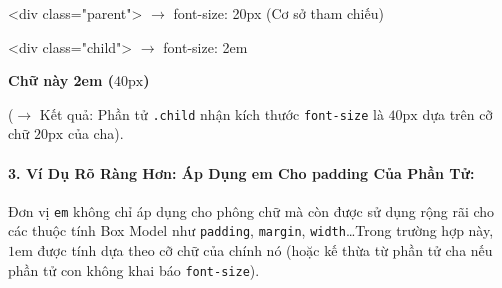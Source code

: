 \documentclass[11pt,oneside]{book}
\newcommand{\codeinline}[1]{\textcolor{accentOrange}{\texttt{#1}}}
\begin{document}
\begin{browserWindow}
\sffamily\small
\begin{tcolorbox}[enhanced, colback=white, colframe=primaryBlue!25, arc=6pt, boxrule=0.8pt, top=8pt, bottom=8pt, left=10pt, right=10pt]
  \begin{tcolorbox}[enhanced, colback=slateBg, colframe=gray!30, arc=4pt, boxrule=0.8pt, top=6pt, bottom=6pt, left=8pt, right=8pt]
    \textcolor{gray!80!black}{\scriptsize\ttfamily <div class="parent"> $\rightarrow$ font-size: 20px (Cơ sở tham chiếu)}
    \par\vspace{4pt}
    \begin{tcolorbox}[enhanced, colback=white, colframe=primaryBlue!40, arc=4pt, boxrule=1pt, top=6pt, bottom=6pt, left=8pt, right=8pt]
      \textcolor{primaryBlue}{\scriptsize\ttfamily <div class="child"> $\rightarrow$ font-size: 2em}
      \par\vspace{3pt}
      {\fontsize{18pt}{22pt}\selectfont \textbf{\color{primaryBlue}Chữ này 2em ($40\text{px}$)}\par}
      \vspace{3pt}
    \end{tcolorbox}
  \end{tcolorbox}
  \par\vspace{4pt}
  \textcolor{primaryBlue}{\scriptsize ($\rightarrow$ Kết quả: Phần tử \codeinline{.child} nhận kích thước \codeinline{font-size} là $40\text{px}$ dựa trên cỡ chữ $20\text{px}$ của cha).}
\end{tcolorbox}
\end{browserWindow}

\paragraph{3. Ví Dụ Rõ Ràng Hơn: Áp Dụng em Cho padding Của Phần Tử:}
Đơn vị \codeinline{em} không chỉ áp dụng cho phông chữ mà còn được sử dụng rộng rãi cho các thuộc tính Box Model như \codeinline{padding}, \codeinline{margin}, \codeinline{width}\dots Trong trường hợp này, $1\text{em}$ được tính dựa theo cỡ chữ của chính nó (hoặc kế thừa từ phần tử cha nếu phần tử con không khai báo \codeinline{font-size}).
\end{document}
